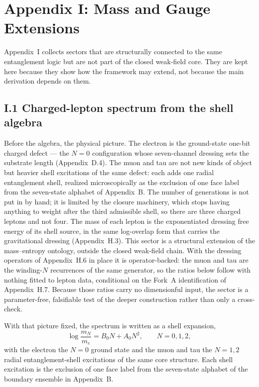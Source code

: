 \documentclass[11pt]{article}
\begin{document}
\section*{Appendix I: Mass and Gauge Extensions}

Appendix~I collects sectors that are structurally connected to the same entanglement logic but are not part of the closed weak-field core. They are kept here because they show how the framework may extend, not because the main derivation depends on them.

\subsection*{I.1 Charged-lepton spectrum from the shell algebra}

Before the algebra, the physical picture. The electron is the ground-state one-bit charged defect --- the $N=0$ configuration whose seven-channel dressing sets the substrate length (Appendix~D.4). The muon and tau are not new kinds of object but heavier shell excitations of the same defect: each adds one radial entanglement shell, realized microscopically as the exclusion of one face label from the seven-state alphabet of Appendix~B. The number of generations is not put in by hand; it is limited by the closure machinery, which stops having anything to weight after the third admissible shell, so there are three charged leptons and not four. The mass of each lepton is the exponentiated dressing free energy of its shell source, in the same log-overlap form that carries the gravitational dressing (Appendix~H.3). This sector is a structural extension of the mass--entropy ontology, outside the closed weak-field chain. With the dressing operators of Appendix~H.6 in place it is operator-backed: the muon and tau are the winding-$N$ recurrences of the same generator, so the ratios below follow with nothing fitted to lepton data, conditional on the Fork~A identification of Appendix~H.7. Because those ratios carry no dimensionful input, the sector is a parameter-free, falsifiable test of the deeper construction rather than only a cross-check.

With that picture fixed, the spectrum is written as a shell expansion,
\[
\log\frac{m_N}{m_e}=B_0 N+A_0 N^2,
\qquad
N=0,1,2,
\]
with the electron the $N=0$ ground state and the muon and tau the $N=1,2$ radial entanglement-shell excitations of the same core structure. Each shell excitation is the exclusion of one face label from the seven-state alphabet of the boundary ensemble in Appendix~B.
\end{document}

